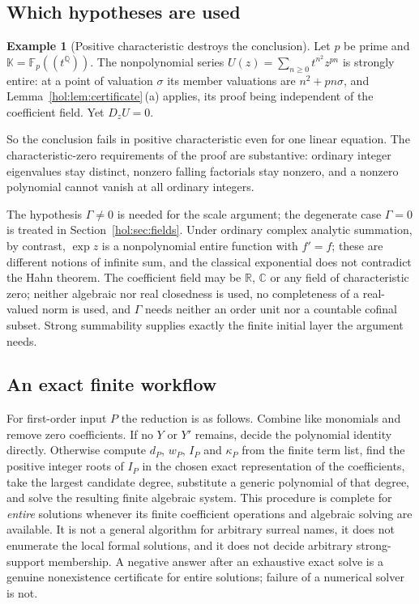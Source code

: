 \documentclass[11pt]{article}
\numberwithin{equation}{section}
\theoremstyle{definition}
\newtheorem{example}[theorem]{Example}
\theoremstyle{remark}
\newcommand{\C}{\mathbb C}
\newcommand{\R}{\mathbb R}
\newcommand{\Q}{\mathbb Q}
\newcommand{\KK}{\mathbb K}
\begin{document}
\subsection{Which hypotheses are used}\label{hol:nl:sub:hypotheses}

\begin{example}[Positive characteristic destroys the conclusion]
\label{hol:nl:ex:charp}
Let $p$ be prime and $\KK=\mathbb F_p((t^\Q))$. The nonpolynomial series
$U(z)=\sum_{n\ge0}t^{n^2}z^{pn}$ is strongly entire: at a point of valuation
$\sigma$ its member valuations are $n^2+pn\sigma$, and
Lemma~\ref{hol:lem:certificate}\,(a) applies, its proof being independent of
the coefficient field. Yet $D_zU=0$.
\end{example}

So the conclusion fails in positive characteristic even for one linear
equation. The characteristic-zero requirements of the proof are substantive:
ordinary integer eigenvalues stay distinct, nonzero falling factorials stay
nonzero, and a nonzero polynomial cannot vanish at all ordinary integers.

The hypothesis $\Gamma\ne0$ is needed for the scale argument; the degenerate
case $\Gamma=0$ is treated in Section~\ref{hol:sec:fields}. Under ordinary
complex analytic summation, by contrast, $\exp z$ is a nonpolynomial entire
function with $f'=f$; these are different notions of infinite sum, and the
classical exponential does not contradict the Hahn theorem. The coefficient
field may be $\R$, $\C$ or any field of characteristic zero; neither algebraic
nor real closedness is used, no completeness of a real-valued norm is used,
and $\Gamma$ needs neither an order unit nor a countable cofinal subset.
Strong summability supplies exactly the finite initial layer the argument
needs.

\subsection{An exact finite workflow}\label{hol:nl:sub:workflow}

For first-order input $P$ the reduction is as follows. Combine like monomials
and remove zero coefficients. If no $Y$ or $Y'$ remains, decide the polynomial
identity directly. Otherwise compute $d_P$, $w_P$, $I_P$ and $\kappa_P$ from
the finite term list, find the positive integer roots of $I_P$ in the chosen
exact representation of the coefficients, take the largest candidate degree,
substitute a generic polynomial of that degree, and solve the resulting
finite algebraic system. This procedure is complete for \emph{entire}
solutions whenever its finite coefficient operations and algebraic solving are
available. It is not a general algorithm for arbitrary surreal names, it does
not enumerate the local formal solutions, and it does not decide arbitrary
strong-support membership. A negative answer after an exhaustive exact solve
is a genuine nonexistence certificate for entire solutions; failure of a
numerical solver is not.
\end{document}
